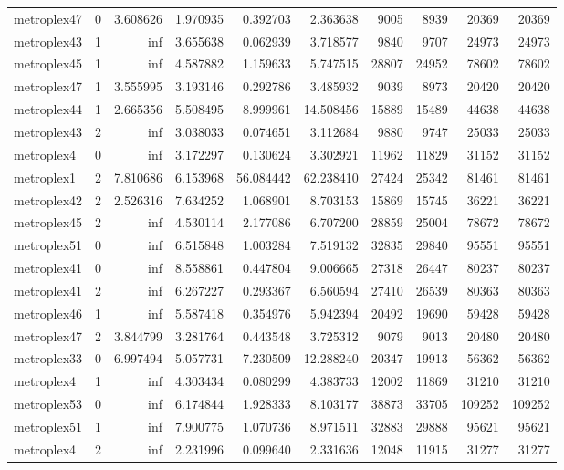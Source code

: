 \begin{longtable}{|l|r|r|r|r|r|r|r|r|r|}
metroplex47 & 0 & 3.608626 & 1.970935 & 0.392703 & 2.363638 & 9005 & 8939 & 20369 & 20369 \\
metroplex43 & 1 & inf & 3.655638 & 0.062939 & 3.718577 & 9840 & 9707 & 24973 & 24973 \\
metroplex45 & 1 & inf & 4.587882 & 1.159633 & 5.747515 & 28807 & 24952 & 78602 & 78602 \\
metroplex47 & 1 & 3.555995 & 3.193146 & 0.292786 & 3.485932 & 9039 & 8973 & 20420 & 20420 \\
metroplex44 & 1 & 2.665356 & 5.508495 & 8.999961 & 14.508456 & 15889 & 15489 & 44638 & 44638 \\
metroplex43 & 2 & inf & 3.038033 & 0.074651 & 3.112684 & 9880 & 9747 & 25033 & 25033 \\
metroplex4 & 0 & inf & 3.172297 & 0.130624 & 3.302921 & 11962 & 11829 & 31152 & 31152 \\
metroplex1 & 2 & 7.810686 & 6.153968 & 56.084442 & 62.238410 & 27424 & 25342 & 81461 & 81461 \\
metroplex42 & 2 & 2.526316 & 7.634252 & 1.068901 & 8.703153 & 15869 & 15745 & 36221 & 36221 \\
metroplex45 & 2 & inf & 4.530114 & 2.177086 & 6.707200 & 28859 & 25004 & 78672 & 78672 \\
metroplex51 & 0 & inf & 6.515848 & 1.003284 & 7.519132 & 32835 & 29840 & 95551 & 95551 \\
metroplex41 & 0 & inf & 8.558861 & 0.447804 & 9.006665 & 27318 & 26447 & 80237 & 80237 \\
metroplex41 & 2 & inf & 6.267227 & 0.293367 & 6.560594 & 27410 & 26539 & 80363 & 80363 \\
metroplex46 & 1 & inf & 5.587418 & 0.354976 & 5.942394 & 20492 & 19690 & 59428 & 59428 \\
metroplex47 & 2 & 3.844799 & 3.281764 & 0.443548 & 3.725312 & 9079 & 9013 & 20480 & 20480 \\
metroplex33 & 0 & 6.997494 & 5.057731 & 7.230509 & 12.288240 & 20347 & 19913 & 56362 & 56362 \\
metroplex4 & 1 & inf & 4.303434 & 0.080299 & 4.383733 & 12002 & 11869 & 31210 & 31210 \\
metroplex53 & 0 & inf & 6.174844 & 1.928333 & 8.103177 & 38873 & 33705 & 109252 & 109252 \\
metroplex51 & 1 & inf & 7.900775 & 1.070736 & 8.971511 & 32883 & 29888 & 95621 & 95621 \\
metroplex4 & 2 & inf & 2.231996 & 0.099640 & 2.331636 & 12048 & 11915 & 31277 & 31277 \\

\end{longtable}

